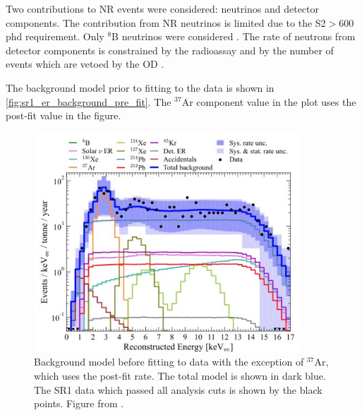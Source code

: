 \par
Two contributions to NR events were considered: neutrinos and detector components.
The contribution from NR neutrinos is limited due to the S2$>$600 phd requirement.
Only ${}^{8}$B neutrinos were considered \cite{lz_ws_sr1_ref}.
The rate of neutrons from detector components is constrained by the radioassay and by the number of events which are vetoed by the OD \cite{lz_sr1_backgrounds_ref}.
\par
The background model prior to fitting to the data is shown in \autoref{fig:sr1_er_background_pre_fit}.
The ${}^{37}$Ar component value in the plot uses the post-fit value in the figure. 

\begin{figure}
    \centering
    \includegraphics[width=10cm]{Figures/EFT/All_SR1_Plots/sr1_bg_model.png}
    \caption{Background model before fitting to data with the exception of ${}^{37}$Ar, which uses the post-fit rate.
             The total model is shown in dark blue.
             The SR1 data which passed all analysis cuts is shown by the black points.
             Figure from \cite{lz_sr1_backgrounds_ref}.}
    \label{fig:sr1_er_background_pre_fit}
\end{figure}

%


